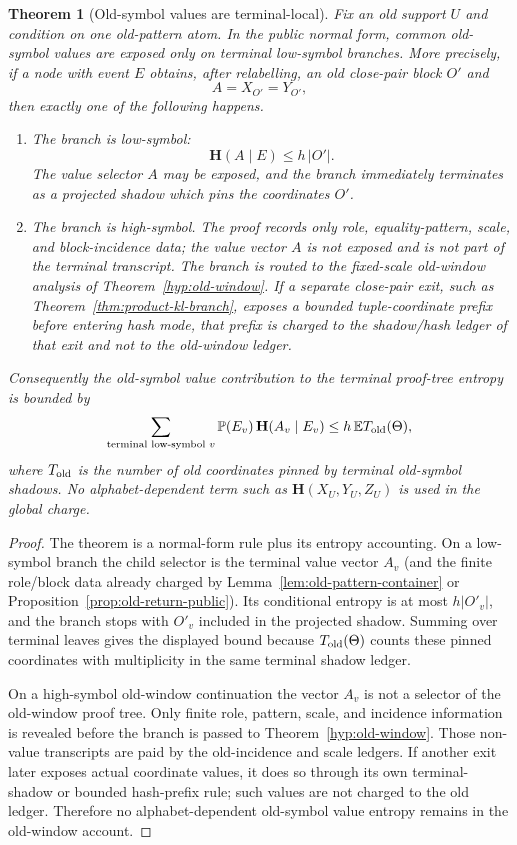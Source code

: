 \documentclass[11pt]{article}
\newtheorem{theorem}{Theorem}[section]
\newcommand{\Prb}{\mathbb P}
\newcommand{\EE}{\mathbb E}
\newcommand{\bfH}{\mathbf H}
\begin{document}
\begin{theorem}[Old-symbol values are terminal-local]
\label{thm:old-symbol-budget}
Fix an old support $U$ and condition on one old-pattern atom.  In the public
normal form, common old-symbol values are exposed only on terminal low-symbol
branches.  More precisely, if a node with event $E$ obtains, after relabelling,
an old close-pair block $O'$ and
\[
  A=X_{O'}=Y_{O'},
\]
then exactly one of the following happens.
\begin{enumerate}[label=\textup{(\roman*)}]
\item The branch is low-symbol:
\[
  \bfH(A\mid E)\le h\,|O'|.
\]
The value selector $A$ may be exposed, and the branch immediately terminates
as a projected shadow which pins the coordinates $O'$.
\item The branch is high-symbol.  The proof records only role, equality-pattern,
scale, and block-incidence data; the value vector $A$ is not exposed and is not
part of the terminal transcript.  The branch is routed to the fixed-scale
old-window analysis of Theorem~\ref{hyp:old-window}.  If a separate
close-pair exit, such as Theorem~\ref{thm:product-kl-branch}, exposes a
bounded tuple-coordinate prefix before entering hash mode, that prefix is
charged to the shadow/hash ledger of that exit and not to the old-window
ledger.
\end{enumerate}
Consequently the old-symbol value contribution to the terminal proof-tree
entropy is bounded by
\[
  \sum_{\textup{terminal low-symbol }v}
    \Prb(E_v)\,\bfH(A_v\mid E_v)
  \le
  h\,\EE T_{\rm old}(\Theta),
\]
where $T_{\rm old}$ is the number of old coordinates pinned by terminal
old-symbol shadows.  No alphabet-dependent term such as
$\bfH(X_U,Y_U,Z_U)$ is used in the global charge.
\end{theorem}

\begin{proof}
The theorem is a normal-form rule plus its entropy accounting.  On a
low-symbol branch the child selector is the terminal value vector $A_v$ (and
the finite role/block data already charged by Lemma~\ref{lem:old-pattern-container}
or Proposition~\ref{prop:old-return-public}).  Its conditional entropy is at
most $h|O'_v|$, and the branch stops with $O'_v$ included in the projected
shadow.  Summing over terminal leaves gives the displayed bound because
$T_{\rm old}(\Theta)$ counts these pinned coordinates with multiplicity in the
same terminal shadow ledger.

On a high-symbol old-window continuation the vector $A_v$ is not a selector of
the old-window proof tree.  Only finite role, pattern, scale, and incidence
information is revealed before the branch is passed to
Theorem~\ref{hyp:old-window}.  Those non-value transcripts are paid by the
old-incidence and scale ledgers.  If another exit later exposes actual
coordinate values, it does so through its own terminal-shadow or bounded
hash-prefix rule; such values are not charged to the old ledger.  Therefore no
alphabet-dependent old-symbol value entropy remains in the old-window account.
\end{proof}
\end{document}
